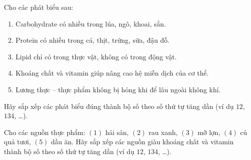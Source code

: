 \documentclass[Main.tex]{subfiles}
\begin{document}
\begin{ex}%
	Cho các phát biểu sau:
	\begin{enumerate}[(1)]
		\item Carbohydrate có nhiều trong lúa, ngô, khoai, sắn.
		\item Protein có nhiều trong cá, thịt, trứng, sữa, đậu đỗ.
		\item Lipid chỉ có trong thực vật, không có trong động vật.
		\item Khoáng chất và vitamin giúp nâng cao hệ miễn dịch của cơ thể.
		\item Lương thực -- thực phẩm không bị hỏng khi để lâu ngoài không khí.
	\end{enumerate}
	Hãy sắp xếp các phát biểu đúng thành bộ số theo số thứ tự tăng dần (ví dụ $12$, $134$, …).
\end{ex}

\begin{ex}%
	Cho các nguồn thực phẩm: $(1)$ hải sản, $(2)$ rau xanh, $(3)$ mỡ lợn, $(4)$ củ quả tươi, $(5)$ dầu ăn. Hãy sắp xếp các nguồn giàu khoáng chất và vitamin thành bộ số theo số thứ tự tăng dần (ví dụ $12$, $134$, …).
\end{ex}
\end{document}
